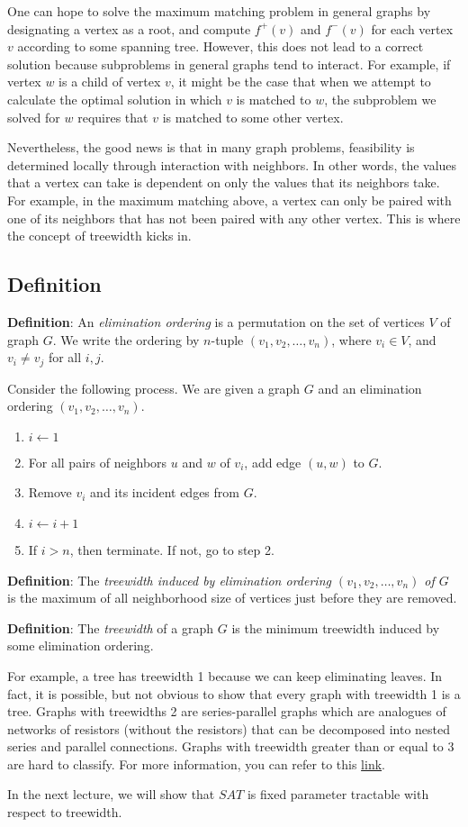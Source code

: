 \documentclass{article}
\begin{document}
One can hope to solve the maximum matching problem in general graphs by designating a vertex as a root, and
compute $f^{+}(v)$ and $f^{-}(v)$ for each vertex $v$ according to some spanning tree. However, this does 
not lead to a correct solution because subproblems in general graphs tend to interact. For example, if vertex $w$
is a child of vertex $v$, it might be the case that when we attempt to calculate the optimal solution in which
$v$ is matched to $w$, the subproblem we solved for $w$ requires that $v$ is matched to some other vertex.

Nevertheless, the good news is that in many graph problems, feasibility is determined locally through interaction
with neighbors. In other words, the values that a vertex can take is dependent on only the values that its
neighbors take. For example, in the maximum matching above, a vertex can only be paired with one of its neighbors
that has not been paired with any other vertex. This is where the concept of treewidth kicks in.

\subsection{Definition}

\textbf{Definition}:
An \emph{elimination ordering} is a permutation on the set of vertices $V$ of graph $G$. We write the ordering by
$n$-tuple $(v_1, v_2, \ldots, v_n)$, where $v_i \in V$, and $v_i \neq v_j$ for all $i,j$.

Consider the following process. We are given a graph $G$ and an elimination ordering $(v_1, v_2, \ldots, v_n)$.
\begin{enumerate}
\item $i \gets 1$
\item	For all pairs of neighbors $u$ and $w$ of $v_i$, add edge $(u,w)$ to $G$. 
\item Remove $v_i$ and its incident edges from $G$.
\item $i \gets i+1$
\item If $i > n$, then terminate. If not, go to step 2.
\end{enumerate}

\textbf{Definition}:
The \emph{treewidth induced by elimination ordering $(v_1, v_2, \ldots, v_n)$ of $G$} is the maximum of all neighborhood
size of vertices just before they are removed.

\textbf{Definition}:
The \emph{treewidth} of a graph $G$ is the minimum treewidth induced by some elimination ordering.

For example, a tree has treewidth 1 because we can keep eliminating leaves. In fact, it is possible, but not obvious
to show that every graph with treewidth 1 is a tree. Graphs with treewidths 2 are series-parallel graphs which are
analogues of networks of resistors (without the resistors) that can be decomposed into nested series and parallel connections.
Graphs with treewidth greater than or equal to 3 are hard to classify. For more information, you can refer to this \href{http://en.wikipedia.org/wiki/Tree_decomposition#Graph_minors}{link}.

In the next lecture, we will show that $SAT$ is fixed parameter tractable with respect to treewidth.
\end{document}
